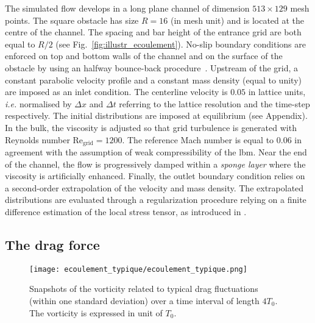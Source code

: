 %
The simulated flow develops in a long plane channel of dimension $513 \times 129$ mesh points. The square obstacle has size $R=16$ (in mesh unit) and is located at the centre of the channel. The spacing and bar height of the entrance grid are both equal to $R/2$ (see Fig.~\ref{fig:illustr_ecoulement}).
%
No-slip boundary conditions are enforced on top and bottom walls of the channel and on the surface of the obstacle by using an halfway bounce-back procedure~\citep{lbm_book}.
%
Upstream of the grid, a constant parabolic velocity profile and a constant mass density (equal to unity) are imposed as an inlet condition.
The centerline velocity is $0.05$ in lattice units, \textit{i.e.} normalised by $\Delta x$ and $\Delta t$ referring to the lattice resolution and the time-step respectively. The initial distributions are imposed at equilibrium (see Appendix).
In the bulk, the viscosity is adjusted so that grid turbulence is generated with Reynolds number $\mathrm{Re_{grid}}=1200$. The reference Mach number is equal to $0.06$ in agreement with the assumption of weak compressibility of the \ac{lbm}.
Near the end of the channel, the flow is progressively damped within a \textit{sponge layer} where the viscosity is artificially enhanced.
Finally, the outlet boundary condition relies on a second-order extrapolation of the velocity and mass density.
The extrapolated distributions are evaluated through a regularization procedure relying on a finite difference estimation of the local stress tensor, as introduced in \cite{latt2008straight}.


\subsection{The drag force}
\label{sec:drag_force}

\begin{figure}
	\centering
	\texttt{[image: ecoulement\_typique/ecoulement\_typique.png]}
	\caption{Snapshots of the vorticity related to typical drag fluctuations (within one standard deviation) over a time interval of length $4T_0$. The vorticity is expressed in unit of $T_0$.}
	\label{fig:typical_vorticity}
\end{figure}



